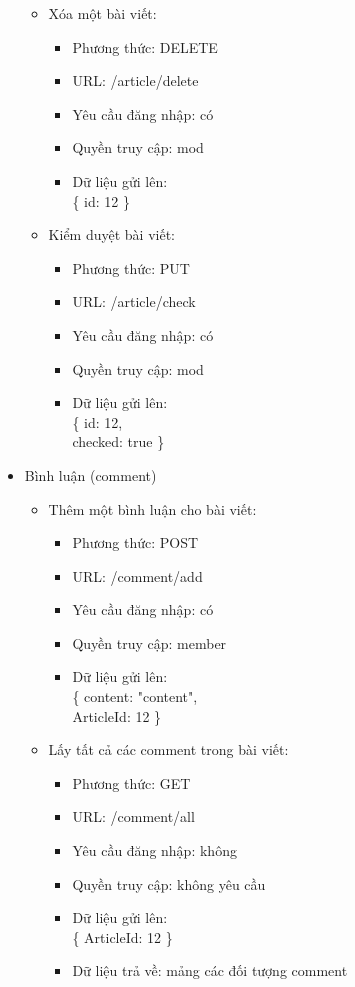 \documentclass[a4paper,12pt,oneside]{article}
\begin{document}
\begin{itemize}
\begin{itemize}
\begin{itemize}
	\end{itemize}

\item Xóa một bài viết:
	\begin{itemize}
	\item Phương thức: DELETE
	\item URL: /article/delete
	\item Yêu cầu đăng nhập: có
	\item Quyền truy cập: mod
	\item Dữ liệu gửi lên:\\
		\{
			id: 12
		\}
	
	\end{itemize}

\item Kiểm duyệt bài viết:
	\begin{itemize}
	\item Phương thức: PUT
	\item URL: /article/check
	\item Yêu cầu đăng nhập: có
	\item Quyền truy cập: mod
	\item Dữ liệu gửi lên:\\
		\{
			id: 12, \\
			checked: true
		\}
	
	\end{itemize}

\end{itemize}

\item Bình luận (comment)

\begin{itemize}
\item Thêm một bình luận cho bài viết:
	\begin{itemize}
	\item Phương thức: POST
	\item URL: /comment/add
	\item Yêu cầu đăng nhập: có
	\item Quyền truy cập: member
	\item Dữ liệu gửi lên:\\ 
		\{
			content: "content",\\
			ArticleId: 12
		\}

	\end{itemize}

\item Lấy tất cả các comment trong bài viết:
	\begin{itemize}
	\item Phương thức: GET
	\item URL: /comment/all
	\item Yêu cầu đăng nhập: không
	\item Quyền truy cập: không yêu cầu
	\item Dữ liệu gửi lên:\\ 
		\{
			ArticleId: 12
		\}
	\item Dữ liệu trả về: mảng các đối tượng comment
	\end{itemize}


\end{itemize}
\end{itemize}
\end{document}
